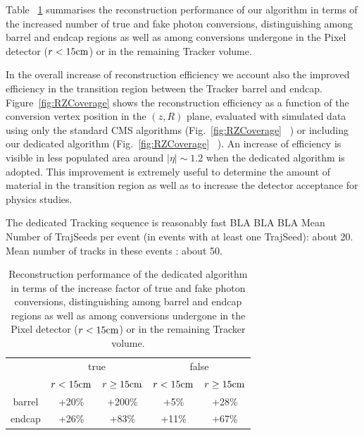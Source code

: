 \documentclass[a4paper]{jpconf}
\begin{document}
 Table ~\ref{tab:perfTable} summarises the reconstruction performance of our algorithm in terms of the increased number of true and fake photon conversions, distinguishing among barrel and endcap regions as well as among conversions undergone in the Pixel detector ($r < 15 \rm cm$) or in the remaining Tracker volume.

In the overall increase of reconstruction efficiency we account also the improved efficiency in the transition region between the Tracker barrel and endcap.  
Figure~\ref{fig:RZCoverage} shows the reconstruction efficiency as a function of the conversion vertex position in the $(z,R)$ plane, evaluated with simulated data using only the standard CMS algorithms (Fig.~\ref{fig:RZCoverage}~ ) or including our dedicated algorithm (Fig.~\ref{fig:RZCoverage}~ ). An increase of efficiency is visible in less populated area around $|\eta| \sim 1.2$ when the dedicated algorithm is adopted. This improvement is extremely useful to determine  the amount of material in the transition region as well as to increase the detector acceptance for physics studies.


The dedicated Tracking sequence is reasonably fast BLA BLA BLA 
Mean Number of TrajSeeds per event (in events with at least one TrajSeed):  about 20.
Mean number of tracks in these events : about  50.




\begin{table}[htdp]
\caption{Reconstruction performance of the dedicated algorithm in terms of the increase factor of true and fake photon conversions, distinguishing among barrel and endcap regions as well as among conversions undergone in the Pixel detector ($r < 15 \rm cm$) or in the remaining Tracker volume.
}
\begin{center}
\begin{tabular}{c|c|c|c|c}
& \multicolumn{2}{c}{true} & \multicolumn{2}{|c}{false}  \\
& $r < 15 \rm cm$ & $r \ge 15 \rm cm$ & $r < 15 \rm cm$ & $r \ge 15 \rm cm$ \\
\hline
barrel & +20\% & +200\% & +5\% & +28\% \\
\hline
endcap & +26\% & +83\% & +11\% & +67\% 
\end{tabular}
\end{center}
\label{tab:perfTable}
\end{table}%
\end{document}
